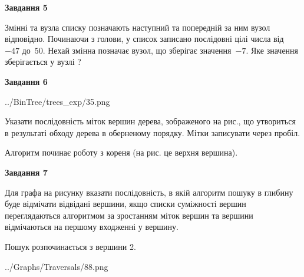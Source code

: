 \documentclass[12pt, ukrainian]{article}
\begin{document}
{\begin {large}
{\begin {center}\textbf{Завдання 5}\end {center}}\par
Змінні  та  вузла списку позначають наступний та попередній за ним вузол відповідно. Починаючи з голови, у список записано послідовні цілі числа від~$-47$ до~$50$. Нехай змінна  позначає вузол, що зберігає значення~$-7$.
Яке значення зберігається у вузлі  ?\par
\newpage

{\begin {center}\textbf{Завдання 6}\end {center}}\par

\begin{center}
	{../BinTree/trees_exp/35.png}
\end{center}
Указати послідовність міток вершин дерева, зображеного на рис., що утвориться в результаті обходу дерева в оберненому порядку. Мітки записувати через пробіл.\par Алгоритм починає роботу з кореня (на рис. це верхня вершина).\par
\newpage

{\begin {center}\textbf{Завдання 7}\end {center}}\par
Для графа на рисунку вказати послідовність, в якій алгоритм пошуку в глибину буде відмічати відвідані вершини, якщо списки суміжності вершин переглядаються алгоритмом за зростанням міток вершин та вершини відмічаються на першому вход\-женні у вершину.\par
Пошук розпочинається з вершини 2.\par

\begin{center}
	{../Graphs/Traversals/88.png}
\end{center}\par
\newpage


\end{large}}
\end{document}

